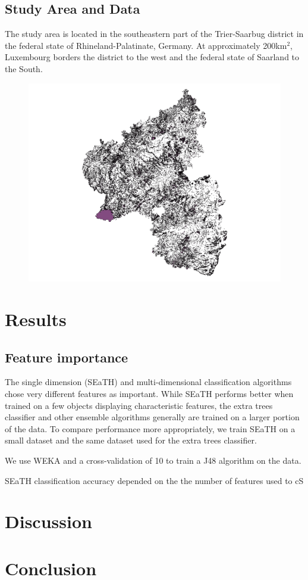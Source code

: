 \documentclass[a4paper,12pt]{article}
\begin{document}
\subsection{Study Area and Data}
The study area is located in the southeastern part of the Trier-Saarbug district
in the federal state of Rhineland-Palatinate, Germany. At approximately
200km$^{2}$, Luxembourg borders the district to the west and the federal state of Saarland to the South.
\begin{figure}
	\includegraphics[width=\textwidth]{diagrams/study_area_small.png}
\end{figure}

\section{Results}
\subsection{Feature importance}
The single dimension (SEaTH) and multi-dimensional classification
algorithms chose very different features as important. While SEaTH performs
better when trained on a few objects displaying characteristic
features\cite{Nussbaum2006}, the extra trees classifier and other ensemble
algorithms generally are trained on a larger portion of the data. To compare
performance more appropriately, we train SEaTH on a small dataset and the same
dataset used for the extra trees classifier.

We use WEKA and a cross-validation of 10 to train a J48 algorithm on the data.

SEaTH classification accuracy depended on the the number of features used to cS

\section{Discussion}

\section{Conclusion}
\end{document}
